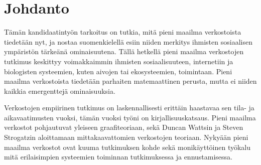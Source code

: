 \documentclass[finnish,12pt,a4paper,pdftex,elec,utf8]{aaltothesis}
\begin{document}

\newpage


\thesistableofcontents

\cleardoublepage
\storeinipagenumber
{}
\setcounter{page}{1}


\section{Johdanto}

\thispagestyle{empty}
Tämän kandidaatintyön tarkoitus on tutkia, mitä pieni maailma verkostoista tiedetään nyt, ja nostaa suomenkielellä esiin niiden merkitys ihmisten sosiaalisen ympäristön tärkeänä ominaisuutena. Tällä hetkellä pieni maailma verkostojen tutkimus keskittyy voimakkaimmin ihmisten sosiaalisuuteen, internetiin ja biologisten systeemien, kuten aivojen tai ekosysteemien, toimintaan. Pieni maailma verkostoista tiedetään parhaiten matemaattinen perusta, mutta ei niiden kaikkia emergenttejä ominaisuuksia.

Verkostojen empiirinen tutkimus on laskennallisesti erittäin haastavaa sen tila- ja aikavaatimusten vuoksi, tämän vuoksi työni on kirjallisuuskatsaus. Pieni maailma verkostot pohjautuvat yleiseen graafiteoriaan, sekä Duncan Wattsin ja Steven Strogatzin aloittamaan mittakaavattomien verkostojen teoriaan. Nykyään pieni maailma verkostot ovat kuuma tutkimuksen kohde sekä monikäyttöinen työkalu mitä erilaisimpien systeemien toiminnan tutkimuksessa ja ennustamisessa.
\end{document}
